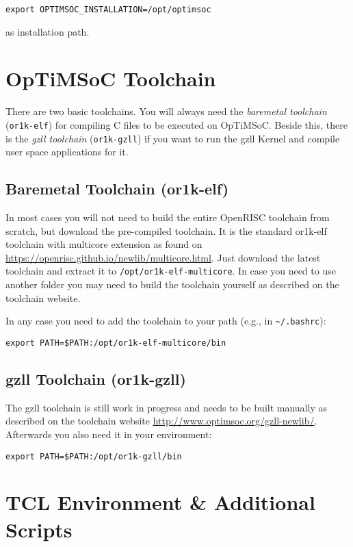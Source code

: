 \begin{lstlisting}
export OPTIMSOC_INSTALLATION=/opt/optimsoc
\end{lstlisting}

as installation path.

\section{OpTiMSoC Toolchain}

There are two basic toolchains. You will always need the
\emph{baremetal toolchain} (\verb|or1k-elf|) for compiling C files to
be executed on OpTiMSoC. Beside this, there is the \emph{gzll
  toolchain} (\verb|or1k-gzll|) if you want to run the gzll Kernel and
compile user space applications for it.

\subsection{Baremetal Toolchain (or1k-elf)}

In most cases you will not need to build the entire OpenRISC toolchain
from scratch, but download the pre-compiled toolchain. It is the
standard or1k-elf toolchain with multicore extension as found on
\url{https://openrisc.github.io/newlib/multicore.html}. Just download
the latest toolchain and extract it to
\verb|/opt/or1k-elf-multicore|. In case you need to use another folder
you may need to build the toolchain yourself as described on the
toolchain website.

In any case you need to add the toolchain to your path (e.g., in
\verb|~/.bashrc|):

\begin{lstlisting}
export PATH=$PATH:/opt/or1k-elf-multicore/bin
\end{lstlisting}

\subsection{gzll Toolchain (or1k-gzll)}

The gzll toolchain is still work in progress and needs to be built
manually as described on the toolchain website
\url{http://www.optimsoc.org/gzll-newlib/}. Afterwards you also need
it in your environment:

\begin{lstlisting}
export PATH=$PATH:/opt/or1k-gzll/bin
\end{lstlisting}

\section{TCL Environment \& Additional Scripts}

